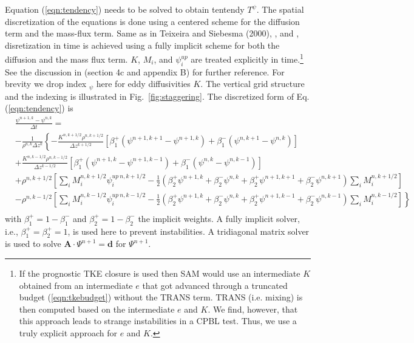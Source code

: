 \documentclass[dvipdfmx,a4paper,10pt]{article}
\begin{document}
Equation (\ref{eqn:tendency}) needs to be solved to obtain tentendy $T^{\psi}$. The spatial discretization of the equations is done using a centered scheme for the diffusion term and the mass-flux term. Same as in Teixeira and Siebesma (2000), \cite{siebesma07}, and \cite{soares04}, disretization in time is achieved using a fully implicit scheme for both the diffusion and the mass flux term. $K$, $M_i$, and $\psi^{up}_i$ are treated explicitly in time.\footnote{If the prognostic TKE closure is used then SAM would use an intermediate $K$ obtained from an intermediate $e$ that got advanced through a truncated budget (\ref{eqn:tkebudget}) without the TRANS term. TRANS (i.e. mixing) is then computed based on the intermediate $e$ and $K$. We find, however, that this approach leads to strange instabilities in a CPBL test. Thus, we use a truly explicit approach for $e$ and $K$.} See the discussion in \cite{siebesma07} (section 4c and appendix B) for further reference. For brevity we drop index $_\psi$ here for eddy diffusivities $K$. The vertical grid structure and the indexing is illustrated in Fig.~\ref{fig:staggering}. The discretized form of Eq. (\ref{eqn:tendency}) is
\begin{align*}
  &\frac{\psi^{n+1,k}- \psi^{n,k} }{\Delta t} =\\
  &-\frac{1}{\rho^{n,k}\Delta z^{k}}\left\{ -\frac{K^{n,k+1/2}\rho^{n,k+1/2} }{\Delta z^{k+1/2}} [\beta_1^+(\psi^{n+1,k+1}-\psi^{n+1,k}) + \beta_1^-(\psi^{n,k+1}-\psi^{n,k})] \right. \\
    & \left.+\frac{K^{n,k-1/2}\rho^{n,k-1/2} }{\Delta z^{k-1/2}} [\beta_1^+(\psi^{n+1,k}-\psi^{n+1,k-1}) + \beta_1^-(\psi^{n,k}-\psi^{n,k-1})] \right.\\
    & \left. +\rho^{n,k+1/2}\left[\sum_i M_i^{n,k+1/2}\psi_i^{up~n,k+1/2} - \frac{1}{2}(\beta_2^+\psi^{n+1,k}+\beta_2^-\psi^{n,k}+\beta_2^+\psi^{n+1,k+1}+\beta_2^-\psi^{n,k+1} )\sum_i M_i^{n,k+1/2} \right]\right.\\
    &\left.-\rho^{n,k-1/2}\left[\sum_i M_i^{n,k-1/2}\psi_i^{up~n,k-1/2} - \frac{1}{2}(\beta_2^+\psi^{n+1,k}+\beta_2^-\psi^{n,k}+\beta_2^+\psi^{n+1,k-1}+\beta_2^-\psi^{n,k-1} )\sum_i M_i^{n,k-1/2} \right] \right\}\\
\end{align*}
with $\beta_1^+=1-\beta_1^-$ and $\beta_2^+=1-\beta_2^-$ the implicit weights. A fully implicit solver, i.e., $\beta_1^{+}=\beta_2^{+}=1$, is used here to prevent instabilities. A tridiagonal matrix solver is used to solve $\mathbf{A}\cdot\Psi^{n+1}=\mathbf{d}$ for $\Psi^{n+1}$. 
\end{document}
